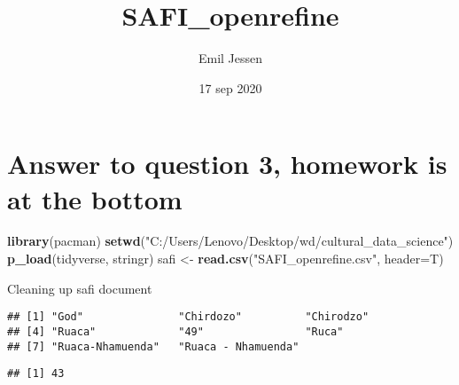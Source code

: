 \documentclass[]{article}
\title{SAFI\_openrefine}
\author{Emil Jessen}
\date{17 sep 2020}
\newenvironment{Shaded}{\begin{snugshade}}{\end{snugshade}}
\newcommand{\KeywordTok}[1]{\textcolor[rgb]{0.13,0.29,0.53}{\textbf{#1}}}
\newcommand{\DataTypeTok}[1]{\textcolor[rgb]{0.13,0.29,0.53}{#1}}
\newcommand{\StringTok}[1]{\textcolor[rgb]{0.31,0.60,0.02}{#1}}
\newcommand{\OperatorTok}[1]{\textcolor[rgb]{0.81,0.36,0.00}{\textbf{#1}}}
\newcommand{\NormalTok}[1]{#1}
\begin{document}
\maketitle

\section{Answer to question 3, homework is at the
bottom}\label{answer-to-question-3-homework-is-at-the-bottom}

\begin{Shaded}
\begin{Highlighting}[]
\KeywordTok{library}\NormalTok{(pacman)}
\KeywordTok{setwd}\NormalTok{(}\StringTok{"C:/Users/Lenovo/Desktop/wd/cultural_data_science"}\NormalTok{)}
\KeywordTok{p_load}\NormalTok{(tidyverse, stringr)}
\NormalTok{safi <-}\StringTok{ }\KeywordTok{read.csv}\NormalTok{(}\StringTok{"SAFI_openrefine.csv"}\NormalTok{, }\DataTypeTok{header=}\NormalTok{T)}
\end{Highlighting}
\end{Shaded}

Cleaning up safi document

\begin{Shaded}
\end{Shaded}

\begin{verbatim}
## [1] "God"               "Chirdozo"          "Chirodzo"         
## [4] "Ruaca"             "49"                "Ruca"             
## [7] "Ruaca-Nhamuenda"   "Ruaca - Nhamuenda"
\end{verbatim}

\begin{Shaded}
\end{Shaded}

\begin{verbatim}
## [1] 43
\end{verbatim}
\end{document}
